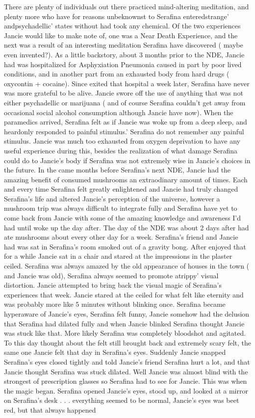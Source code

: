 \documentclass[12pt]{book}
\begin{document}
There are plenty of individuals out there practiced mind-altering meditation, and plenty more who have for reasons unbeknownst to Serafina enteredstrange' andpsychadellic' states without had took any chemical. Of the two experiences Jancie would like to make note of, one was a Near Death Experience, and the next was a result of an interesting meditation Serafina have discovered ( maybe even invented?). As a little backstory, about 3 months prior to the NDE, Jancie had was hospitalized for Asphyxiation Pneumonia caused in part by poor lived conditions, and in another part from an exhausted body from hard drugs ( oxycontin + cocaine). Since exited that hospital a week later, Serafina have never was more grateful to be alive. Jancie swore off the use of anything that was not either psychadellic or marijuana ( and of course Serafina couldn't get away from occasional social alcohol consumption although Jancie have now). When the paramedics arrived, Serafina felt as if Jancie was woke up from a deep sleep, and heardonly responded to painful stimulus.' Serafina do not remember any painful stimulus. Jancie was much too exhausted from oxygen deprivation to have any useful experience during this, besides the realization of what damage Serafina could do to Jancie's body if Serafina was not extremely wise in Jancie's choices in the future. In the came months before Serafina's next NDE, Jancie had the amazing benefit of consumed mushrooms an extraodinary amount of times. Each and every time Serafina felt greatly enlightened and Jancie had truly changed Serafina's life and altered Jancie's perception of the universe, however a mushroom trip was always difficult to integrate fully and Serafina have yet to come back from Jancie with some of the amazing knowledge and awareness I'd had until woke up the day after. The day of the NDE was about 2 days after had ate mushrooms about every other day for a week. Serafina's friend and Jancie had was sat in Serafina's room smoked out of a gravity bong. After enjoyed that for a while Jancie sat in a chair and stared at the impressions in the plaster ceiled. Serafina was always amazed by the old appearance of houses in the town ( and Jancie was old), Serafina always seemed to promote atrippy' visual distortion. Jancie attempted to bring back the visual magic of Serafina's experiences that week. Jancie stared at the ceiled for what felt like eternity and was probably more like 5 minutes without blinking once. Serafina became hyperaware of Jancie's eyes, Serafina felt funny, Jancie somehow had the delusion that Serafina had dilated fully and when Jancie blinked Serafina thought Jancie was stuck like that. More likely Serafina was completely bloodshot and agitated. To this day thought about the felt still brought back and extremely scary felt, the same one Jancie felt that day in Serafina's eyes. Suddenly Jancie snapped Serafina's eyes closed tightly and told Jancie's friend Serafina hurt a lot, and that Jancie thought Serafina was stuck dilated. Well Jancie was almost blind with the strongest of prescription glasses so Serafina had to see for Jancie. This was when the magic began. Serafina opened Jancie's eyes, stood up, and looked at a mirror on Serafina's desk . . .  everything seemed to be normal, Jancie's eyes was beet red, but that always happened 
\end{document}
